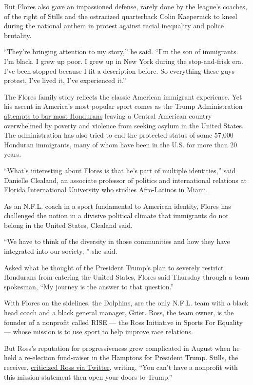 But Flores also gave
\href{https://theshadowleague.com/dolphins-head-coach-brian-flores-i-support-the-player-protests/}{an
impassioned defense}, rarely done by the league's coaches, of the right
of Stills and the ostracized quarterback Colin Kaepernick to kneel
during the national anthem in protest against racial inequality and
police brutality.

``They're bringing attention to my story,'' he said. ``I'm the son of
immigrants. I'm black. I grew up poor. I grew up in New York during the
stop-and-frisk era. I've been stopped because I fit a description
before. So everything these guys protest, I've lived it, I've
experienced it.''

The Flores family story reflects the classic American immigrant
experience. Yet his ascent in America's most popular sport comes as the
Trump Administration
\href{https://www.nytimes3xbfgragh.onion/2019/09/14/world/europe/trump-america-asylum-migration.html}{attempts
to bar most Hondurans} leaving a Central American country overwhelmed by
poverty and violence from seeking asylum in the United States. The
administration has also tried to end the protected status of some 57,000
Honduran immigrants, many of whom have been in the U.S. for more than 20
years.

``What's interesting about Flores is that he's part of multiple
identities,'' said Danielle Clealand, an associate professor of politics
and international relations at Florida International University who
studies Afro-Latinos in Miami.

As an N.F.L. coach in a sport fundamental to American identity, Flores
has challenged the notion in a divisive political climate that
immigrants do not belong in the United States, Clealand said.

``We have to think of the diversity in those communities and how they
have integrated into our society, '' she said.

Asked what he thought of the President Trump's plan to severely restrict
Hondurans from entering the United States, Flores said Thursday through
a team spokesman, ``My journey is the answer to that question.''

With Flores on the sidelines, the Dolphins, are the only N.F.L. team
with a black head coach and a black general manager, Grier. Ross, the
team owner, is the founder of a nonprofit called RISE --- the Ross
Initiative in Sports For Equality --- whose mission is to use sport to
help improve race relations.

But Ross's reputation for progressiveness grew complicated in August
when he held a re-election fund-raiser in the Hamptons for President
Trump. Stills, the receiver,
\href{https://www.nytimes3xbfgragh.onion/2019/08/07/sports/football/kenny-stills-dolphins-trump-ross.html}{criticized
Ross via Twitter}, writing, ``You can't have a nonprofit with this
mission statement then open your doors to Trump.''

